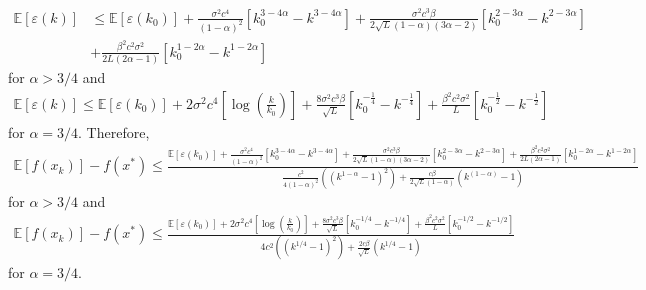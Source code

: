 \documentclass{article}
\theoremstyle{plain}
\theoremstyle{definition}
\theoremstyle{remark}
\begin{document}
    \begin{align}\label{Lyap2_stc_10}
        \mathbb E[\varepsilon(k)]&\leq \mathbb E[\varepsilon(k_0)]+\frac{\sigma^2 c^4}{(1-\alpha)^2} \left[ k_0^{3-4\alpha}-k^{3-4\alpha} \right] + \frac{\sigma^2c^3\beta}{2\sqrt{L}(1-\alpha)(3\alpha -2)}\left[ k_0^{2-3\alpha}-k^{2-3\alpha} \right]\nonumber\\
        &+\frac{\beta^2c^2\sigma^2}{2L(2\alpha-1)}\left[ k_0^{1-2\alpha}-k^{1-2\alpha} \right]
    \end{align}
    for $\alpha > 3/4$ and
    \begin{align}\label{Lyap2_stc_11}
        \mathbb E[\varepsilon(k)]\leq \mathbb E[\varepsilon(k_0)]+2\sigma^2 c^4 \left[ \log(\frac{k}{k_0}) \right] + \frac{8\sigma^2c^3\beta}{\sqrt{L}}\left[ k_0^{-\tfrac{1}{4}}-k^{-\tfrac{1}{4}} \right]
        +\frac{\beta^2c^2\sigma^2}{L}\left[ k_0^{-\tfrac{1}{2}}-k^{-\tfrac{1}{2}} \right]
    \end{align}
    for $\alpha=3/4$. Therefore,
    \begin{align}\label{Lyap2_stc_12}
        \mathbb E[f(x_k)]-f(x^*)\leq \tfrac{\mathbb E[\varepsilon(k_0)]+\frac{\sigma^2 c^4}{(1-\alpha)^2} \left[ k_0^{3-4\alpha}-k^{3-4\alpha} \right] + \frac{\sigma^2c^3\beta}{2\sqrt{L}(1-\alpha)(3\alpha -2)}\left[ k_0^{2-3\alpha}-k^{2-3\alpha} \right]+\frac{\beta^2c^2\sigma^2}{2L(2\alpha-1)}\left[ k_0^{1-2\alpha}-k^{1-2\alpha} \right]}{\frac{c^2}{4(1-\alpha)^2}\left((k^{1-\alpha}-1)^2\right)+\frac{c\beta}{2\sqrt{L}(1-\alpha)}\left(k^{(1-\alpha)}-1\right)}
    \end{align}
    for $\alpha > 3/4$ and
    \begin{align}\label{Lyap2_stc_13}
        \mathbb E[f(x_k)]-f(x^*)\leq \tfrac{\mathbb E[\varepsilon(k_0)]+2\sigma^2 c^4 \left[ \log(\frac{k}{k_0}) \right] + \frac{8\sigma^2c^3\beta}{\sqrt{L}}\left[ k_0^{-1/4}-k^{-1/4} \right]
        +\frac{\beta^2c^2\sigma^2}{L}\left[ k_0^{-1/2}-k^{-1/2} \right]}{4c^2\left((k^{1/4}-1)^2\right)+\frac{2c\beta}{\sqrt{L}}\left(k^{1/4}-1\right)}
    \end{align}
    for $\alpha=3/4$.
\end{document}
